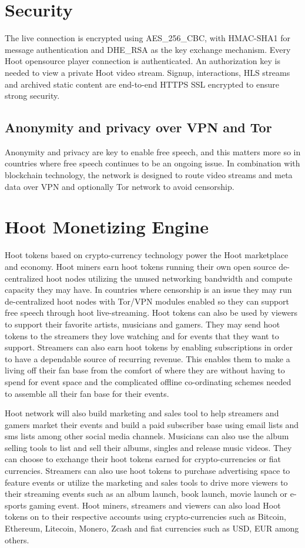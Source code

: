 \documentclass{article}
\begin{document}
\section{Security}
The live connection is encrypted using AES\_256\_CBC, with HMAC-SHA1 for message authentication and DHE\_RSA as the key exchange mechanism. Every Hoot opensource player connection is authenticated.
An authorization key is needed to view a private Hoot video stream. Signup, interactions, HLS streams and archived static content are end-to-end HTTPS  SSL encrypted to ensure strong security.    

\subsection{Anonymity and privacy over VPN and Tor}
Anonymity and privacy are key to enable free speech, and this matters
more so in countries where free speech continues to be an ongoing
issue. In combination with blockchain technology, the network is
designed to route video streams and meta data over VPN and optionally
Tor network to avoid censorship.

\section{Hoot Monetizing Engine}
Hoot tokens based on crypto-currency technology power the Hoot
marketplace and economy. Hoot miners earn hoot tokens running their own open source
de-centralized hoot nodes utilizing the unused networking bandwidth
and compute capacity they may have. In countries where censorship is an issue they
may run de-centralized hoot nodes with Tor/VPN modules enabled so they can
support free speech through hoot
live-streaming. Hoot tokens can also be used by viewers to support their favorite artists,
musicians and gamers. They may send hoot tokens to the
streamers they love watching and for events that they want to
support. Streamers can also earn hoot tokens by enabling subscriptions in order to have a
dependable source of recurring revenue. This enables them to make a
living off their fan base from the comfort of where they are without
having to spend for event space and the complicated offline
co-ordinating schemes needed to assemble all their fan base for their events.

 Hoot network will also build marketing and sales tool to help
streamers and gamers market their 
events and build a paid subscriber base using email lists and sms lists among other social media
channels. 
Musicians can also use the album selling tools to list and sell
their albums, singles and release music videos. They can
choose to exchange their hoot tokens earned for crypto-currencies or fiat currencies.
 Streamers can also use hoot tokens to
purchase advertising space to feature events or utilize the marketing and sales
tools to drive more viewers to their
streaming events such as an album launch, book launch, movie launch or
e-sports gaming event. Hoot miners, streamers and viewers can also load Hoot
tokens on to their respective accounts using crypto-currencies such as Bitcoin,
Ethereum, Litecoin, Monero, Zcash and fiat currencies such as USD, EUR among others.
\end{document}
